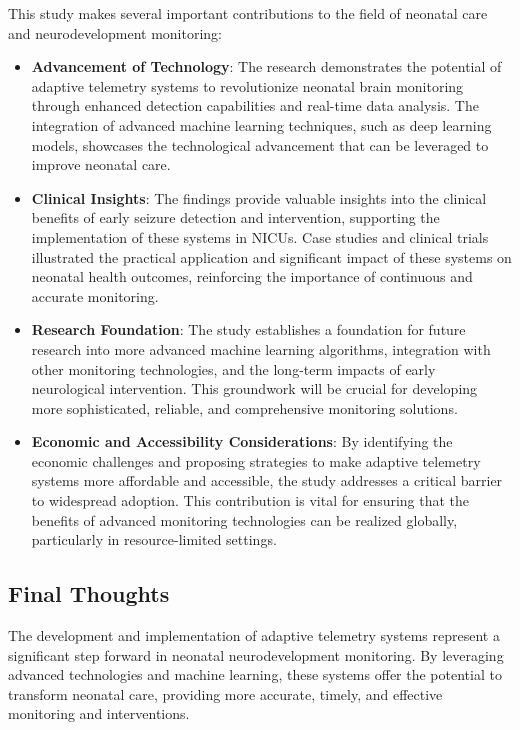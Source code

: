 \documentclass[12pt,journal,compsoc]{IEEEtran}
\begin{document}
This study makes several important contributions to the field of neonatal care and neurodevelopment monitoring:

\begin{itemize}
    \item \textbf{Advancement of Technology}: The research demonstrates the potential of adaptive telemetry systems to revolutionize neonatal brain monitoring through enhanced detection capabilities and real-time data analysis. The integration of advanced machine learning techniques, such as deep learning models, showcases the technological advancement that can be leveraged to improve neonatal care.
    \item \textbf{Clinical Insights}: The findings provide valuable insights into the clinical benefits of early seizure detection and intervention, supporting the implementation of these systems in NICUs. Case studies and clinical trials illustrated the practical application and significant impact of these systems on neonatal health outcomes, reinforcing the importance of continuous and accurate monitoring.
    \item \textbf{Research Foundation}: The study establishes a foundation for future research into more advanced machine learning algorithms, integration with other monitoring technologies, and the long-term impacts of early neurological intervention. This groundwork will be crucial for developing more sophisticated, reliable, and comprehensive monitoring solutions.
    \item \textbf{Economic and Accessibility Considerations}: By identifying the economic challenges and proposing strategies to make adaptive telemetry systems more affordable and accessible, the study addresses a critical barrier to widespread adoption. This contribution is vital for ensuring that the benefits of advanced monitoring technologies can be realized globally, particularly in resource-limited settings.
\end{itemize}

\subsection{Final Thoughts}

The development and implementation of adaptive telemetry systems represent a significant step forward in neonatal neurodevelopment monitoring. By leveraging advanced technologies and machine learning, these systems offer the potential to transform neonatal care, providing more accurate, timely, and effective monitoring and interventions.
\end{document}
